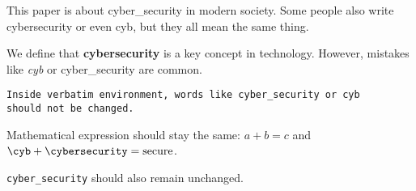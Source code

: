 \documentclass{article}
\begin{document}
This paper is about cyber_security in modern society.
Some people also write cybersecurity or even cyb,
but they all mean the same thing.

We define that \textbf{cybersecurity} is a key concept in technology.
However, mistakes like \emph{cyb} or cyber_security are common.

\begin{verbatim}
Inside verbatim environment, words like cyber_security or cyb
should not be changed.
\end{verbatim}

Mathematical expression should stay the same: $a + b = c$ and
$\cyb + \cybersecurity = \text{secure}$.

\lstinline|cyber_security| should also remain unchanged.
\end{document}

